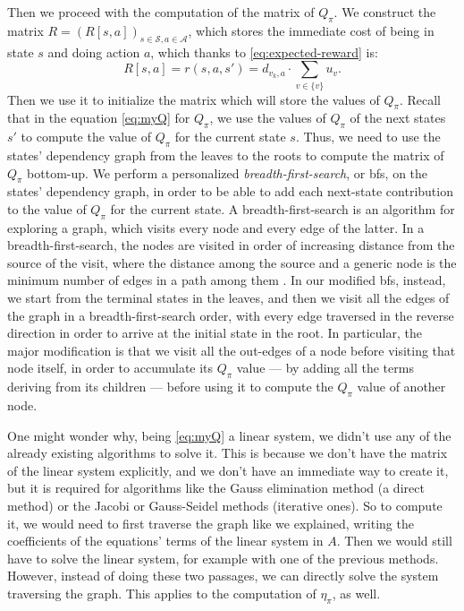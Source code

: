 Then we proceed with the computation of the matrix of $Q_\pi$. We construct the matrix $R = (R[s,a])_{s \in \mathcal S, a \in \mathcal A}$, which stores the immediate cost of being in state $s$ and doing action $a$, which thanks to \eqref{eq:expected-reward} is:
\begin{equation}
    R[s,a] = r(s,a,s') = d_{v_k, a} \cdot \sum_{v \in \{v\}} u_v.
\end{equation}
Then we use it to initialize the matrix which will store the values of $Q_\pi$. Recall that in the equation \eqref{eq:myQ} for $Q_\pi$, we use the values of $Q_\pi$ of the next states $s'$ to compute the value of $Q_\pi$ for the current state $s$. Thus, we need to use the states' dependency graph from the leaves to the roots to compute the matrix of $Q_\pi$ bottom-up. We perform a personalized \emph{breadth-first-search}, or \acrshort{bfs}, on the states' dependency graph, in order to be able to add each next-state contribution to the value of $Q_\pi$ for the current state. A breadth-first-search is an algorithm for exploring a graph, which visits every node and every edge of the latter. In a breadth-first-search, the nodes are visited in order of increasing distance from the source of the visit, where the distance among the source and a generic node is the minimum number of edges in a path among them \cite{Montresor2014}. In our modified \acrshort{bfs}, instead, we start from the terminal states in the leaves, and then we visit all the edges of the graph in a breadth-first-search order, with every edge traversed in the reverse direction in order to arrive at the initial state in the root. In particular, the major modification is that we visit all the out-edges of a node before visiting that node itself, in order to accumulate its $Q_\pi$ value --- by adding all the terms deriving from its children --- before using it to compute the $Q_\pi$ value of another node.

One might wonder why, being \eqref{eq:myQ} a linear system, we didn't use any of the already existing algorithms to solve it. This is because we don't have the matrix of the linear system explicitly, and we don't have an immediate way to create it, but it is required for algorithms like the Gauss elimination method (a direct method) or the Jacobi or Gauss-Seidel methods (iterative ones). So to compute it, we would need to first traverse the graph like we explained, writing the coefficients of the equations' terms of the linear system in $A$. Then we would still have to solve the linear system, for example with one of the previous methods. However, instead of doing these two passages, we can directly solve the system traversing the graph. This applies to the computation of $\eta_\pi$, as well.

